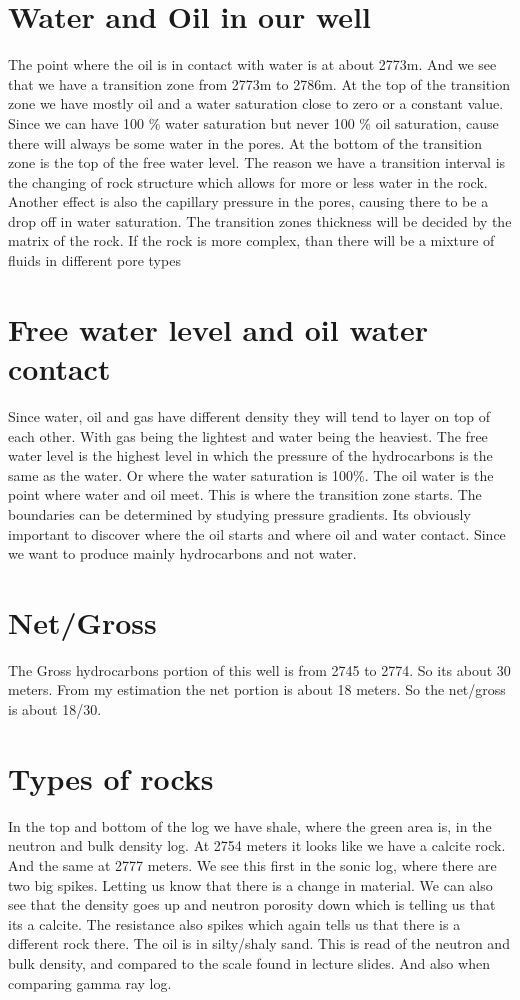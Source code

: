 \documentclass[DIV=calc, paper=a4, fontsize=11pt, twocolumn]{scrartcl}	 %
\begin{document}
\section*{Water and Oil in our well}
The point where the oil is in contact with water is at about 2773m.  And we see that we have a transition zone from 2773m to 2786m. At the top of the transition zone we have mostly oil and a water saturation close to zero or a constant value. Since we can have 100 \% water saturation but never 100 \% oil saturation, cause there will always be some water in the pores. At the bottom of the transition zone is the top of the free water level.
The reason we have a transition interval is the changing of rock structure which allows for more or less water in the rock. Another effect is also the capillary pressure in the pores, causing there to be a drop off in water saturation. The transition zones thickness will be decided by the matrix of the rock. If the rock is more complex, than there will be a mixture of fluids in different pore types

\section*{Free water level and oil water contact }
Since water, oil and gas have different density they will tend to layer on top of each other. With gas being the lightest and water being the heaviest.
The free water level is the highest level in which the pressure of the hydrocarbons is the same as the water. Or where the water saturation is 100\%. The oil water is the point where water and oil meet. This is where the transition zone starts. The boundaries can be determined by studying pressure gradients. Its obviously important to discover where the oil starts and where oil and water contact. Since we want to produce mainly hydrocarbons and not water.

\section*{Net/Gross}
The Gross hydrocarbons portion of this well is from 2745 to 2774. So its about 30 meters. From my estimation the net portion is about 18 meters. So the net/gross is about 18/30.

\section*{Types of rocks}
In the top and bottom of the log we have shale, where the green area is, in the neutron and bulk density log. At 2754 meters it looks like we have a calcite rock. And the same at 2777 meters. We see this first in the sonic log, where there are two big spikes. Letting us know that there is a change in material. We can also see that the density goes up and neutron porosity down which is telling us that its a calcite. The resistance also spikes which again tells us that there is a different rock there. The oil is in silty/shaly sand. This is read of the neutron and bulk density, and compared to the scale found in lecture slides. And also when comparing gamma ray log.
\end{document}
